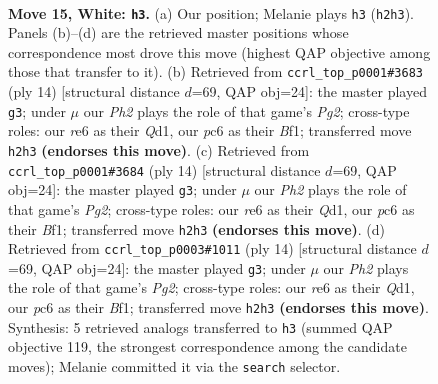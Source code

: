 \documentclass[11pt]{article}
\begin{document}
\clearpage

\begin{figure}[p]\centering
\begin{subfigure}{0.46\textwidth}\centering
\resizebox{\linewidth}{!}{%
\newchessgame
\chessboard[
  setfen={rnbq2k1/pp3ppp/2p1r2n/3p4/PP1P1B1b/2N1PP2/2QKN1PP/R4B1R w - - 1 15},
  showmover=false,
  pgfstyle=straightmove, color=movearrow, markmove={h2-h3}
]}
\caption{}
\end{subfigure}\hfill
\begin{subfigure}{0.46\textwidth}\centering
\resizebox{\linewidth}{!}{%
\newchessgame
\chessboard[
  setfen={rnbqkb1r/1p3pp1/p2p1n2/4p2p/4P3/2N4P/PPP1NPP1/R1BQKB1R w KQkq - 0 8},
  showmover=false,
  pgfstyle=straightmove, color=movearrow, markmove={g2-g3}
]}
\caption{}
\end{subfigure}
\\[4pt]
\begin{subfigure}{0.46\textwidth}\centering
\resizebox{\linewidth}{!}{%
\newchessgame
\chessboard[
  setfen={rnbqkb1r/1p3pp1/p2p1n2/4p2p/4P3/2N4P/PPP1NPP1/R1BQKB1R w KQkq - 0 8},
  showmover=false,
  pgfstyle=straightmove, color=movearrow, markmove={g2-g3}
]}
\caption{}
\end{subfigure}\hfill
\begin{subfigure}{0.46\textwidth}\centering
\resizebox{\linewidth}{!}{%
\newchessgame
\chessboard[
  setfen={rnbqkb1r/1p3pp1/p2p1n2/4p2p/4P3/2N4P/PPP1NPP1/R1BQKB1R w KQkq - 0 8},
  showmover=false,
  pgfstyle=straightmove, color=movearrow, markmove={g2-g3}
]}
\caption{}
\end{subfigure}
\caption{\textbf{Move 15, White: \texttt{h3}.} (a) Our position; Melanie plays \texttt{h3} (\texttt{h2h3}). Panels (b)--(d) are the retrieved master positions whose correspondence most drove this move (highest QAP objective among those that transfer to it). (b) Retrieved from \texttt{ccrl\_top\_p0001\#3683} (ply 14) [structural distance $d$=69, QAP obj=24]: the master played \texttt{g3}; under $\mu$ our \emph{Ph2} plays the role of that game's \emph{Pg2}; cross-type roles: our \emph{r}e6 as their \emph{Q}d1, our \emph{p}c6 as their \emph{B}f1; transferred move \texttt{h2h3} \textbf{(endorses this move)}. (c) Retrieved from \texttt{ccrl\_top\_p0001\#3684} (ply 14) [structural distance $d$=69, QAP obj=24]: the master played \texttt{g3}; under $\mu$ our \emph{Ph2} plays the role of that game's \emph{Pg2}; cross-type roles: our \emph{r}e6 as their \emph{Q}d1, our \emph{p}c6 as their \emph{B}f1; transferred move \texttt{h2h3} \textbf{(endorses this move)}. (d) Retrieved from \texttt{ccrl\_top\_p0003\#1011} (ply 14) [structural distance $d$=69, QAP obj=24]: the master played \texttt{g3}; under $\mu$ our \emph{Ph2} plays the role of that game's \emph{Pg2}; cross-type roles: our \emph{r}e6 as their \emph{Q}d1, our \emph{p}c6 as their \emph{B}f1; transferred move \texttt{h2h3} \textbf{(endorses this move)}. Synthesis: 5 retrieved analogs transferred to \texttt{h3} (summed QAP objective 119, the strongest correspondence among the candidate moves); Melanie committed it via the \texttt{search} selector.}
\label{fig:thought-m28}
\end{figure}
\end{document}
